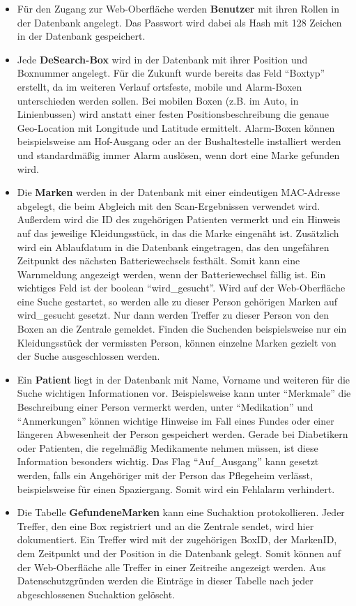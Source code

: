 \begin{itemize}
\item Für den Zugang zur Web-Oberfläche werden \textbf{Benutzer} mit ihren Rollen in der Datenbank angelegt. Das Passwort wird dabei als Hash mit 128 Zeichen in der Datenbank gespeichert. 
\item Jede \textbf{DeSearch-Box} wird in der Datenbank mit ihrer Position und Boxnummer angelegt. Für die Zukunft wurde bereits das Feld \enquote{Boxtyp} erstellt, da im weiteren Verlauf ortsfeste, mobile und Alarm-Boxen unterschieden werden sollen. Bei mobilen Boxen (z.B. im Auto, in Linienbussen) wird anstatt einer festen Positionsbeschreibung die genaue Geo-Location mit Longitude und Latitude ermittelt. Alarm-Boxen können beispielsweise am Hof-Ausgang oder an der Bushaltestelle installiert werden und standardmäßig immer Alarm auslösen, wenn dort eine Marke gefunden wird.
\item Die \textbf{Marken} werden in der Datenbank mit einer eindeutigen MAC-Adresse abgelegt, die beim Abgleich mit den Scan-Ergebnissen verwendet wird. Außerdem wird die ID des zugehörigen Patienten vermerkt und ein Hinweis auf das jeweilige Kleidungsstück, in das die Marke eingenäht ist. Zusätzlich wird ein Ablaufdatum in die Datenbank eingetragen, das den ungefähren Zeitpunkt des nächsten Batteriewechsels festhält. Somit kann eine Warnmeldung angezeigt werden, wenn der Batteriewechsel fällig ist. Ein wichtiges Feld ist der boolean \enquote{wird\_gesucht}. Wird auf der Web-Oberfläche eine Suche gestartet, so werden alle zu dieser Person gehörigen Marken auf wird\_gesucht gesetzt. Nur dann werden Treffer zu dieser Person von den Boxen an die Zentrale gemeldet. Finden die Suchenden beispielsweise nur ein Kleidungsstück der vermissten Person, können einzelne Marken gezielt von der Suche ausgeschlossen werden. 
\item Ein \textbf{Patient} liegt in der Datenbank mit Name, Vorname und weiteren für die Suche wichtigen Informationen vor. Beispielsweise kann unter \enquote{Merkmale} die Beschreibung einer Person vermerkt werden, unter \enquote{Medikation} und \enquote{Anmerkungen} können wichtige Hinweise im Fall eines Fundes oder einer längeren Abwesenheit der Person gespeichert werden. Gerade bei Diabetikern oder Patienten, die regelmäßig Medikamente nehmen müssen, ist diese Information besonders wichtig. Das Flag \enquote{Auf\_Ausgang} kann gesetzt werden, falls ein Angehöriger mit der Person das Pflegeheim verlässt, beispielsweise für einen Spaziergang. Somit wird ein Fehlalarm verhindert.
\item Die Tabelle \textbf{GefundeneMarken} kann eine Suchaktion protokollieren. Jeder Treffer, den eine Box registriert und an die Zentrale sendet, wird hier dokumentiert. Ein Treffer wird mit der zugehörigen BoxID, der MarkenID, dem Zeitpunkt und der Position in die Datenbank gelegt. Somit können auf der Web-Oberfläche alle Treffer in einer Zeitreihe angezeigt werden. Aus Datenschutzgründen werden die Einträge in dieser Tabelle nach jeder abgeschlossenen Suchaktion gelöscht.

\end{itemize}
